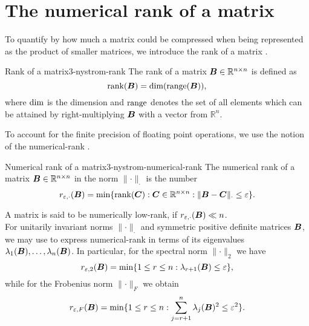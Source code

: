 \section{The numerical rank of a matrix}
\label{sec:3-nystrom-numerical-rank}

To quantify by how much a matrix could be compressed when being represented as the
product of smaller matrices, we introduce the rank of a matrix \cite[section~III.3]{hefferon2012linear}.
\begin{definition}{Rank of a matrix}{3-nystrom-rank}
    The rank of a matrix $\boldsymbol{B} \in \mathbb{R}^{n \times n}$ is defined as
    \begin{equation}
        \operatorname{rank}(\boldsymbol{B}) = \operatorname{dim}(\operatorname{range}(\boldsymbol{B})),
        \label{equ:3-nystrom-rank}
    \end{equation}
    where $\operatorname{dim}$ is the dimension and $\operatorname{range}$ denotes the set of all elements
    which can be attained by right-multiplying $\boldsymbol{B}$ with a vector from $\mathbb{R}^n$.
\end{definition}

To account for the finite precision of floating point operations, we use the
notion of the \gls{numerical-rank} \cite[definition~1.1]{noga2013rank}.
\begin{definition}{Numerical rank of a matrix}{3-nystrom-numerical-rank}
    The numerical rank of a matrix $\boldsymbol{B} \in \mathbb{R}^{n \times n}$
    in the norm $\lVert \cdot \rVert _{\cdot}$ is the number
    \begin{equation}
        r_{\varepsilon, \cdot}(\boldsymbol{B}) = \min \{\operatorname{rank}(\boldsymbol{C}): \boldsymbol{C} \in \mathbb{R}^{n \times n}: \lVert \boldsymbol{B} - \boldsymbol{C} \rVert _{\cdot} \leq \varepsilon \}.
        \label{equ:3-nystrom-def-numerical-rank}
    \end{equation}
\end{definition}%
A matrix is said to be numerically low-rank, if $r_{\varepsilon, \cdot}(\boldsymbol{B}) \ll n$.\\ 

For unitarily invariant norms $\lVert \cdot \rVert _{\cdot}$ and 
symmetric positive definite matrices $\boldsymbol{B}$, we may use
\cite[theorem~5]{mirsky1960truncation} to express \gls{numerical-rank} in terms
of its eigenvalues $\lambda_1(\boldsymbol{B}), \dots, \lambda_n(\boldsymbol{B})$.
In particular, for the spectral norm $\lVert \cdot \rVert _2$ we have
\begin{equation}
    r_{\varepsilon, 2}(\boldsymbol{B}) = \min \{1 \leq r \leq n: \lambda_{r+1}(\boldsymbol{B}) \leq \varepsilon \},
    \label{equ:3-nystrom-numerical-rank-spectral-norm}
\end{equation}
while for the Frobenius norm $\lVert \cdot \rVert _F$ we obtain
\begin{equation}
    r_{\varepsilon, F}(\boldsymbol{B}) = \min \{1 \leq r \leq n: \sum_{j=r+1}^n \lambda_{j}(\boldsymbol{B})^2 \leq \varepsilon^2 \}.
    \label{equ:3-nystrom-numerical-rank-frobenius-norm}
\end{equation}\\

